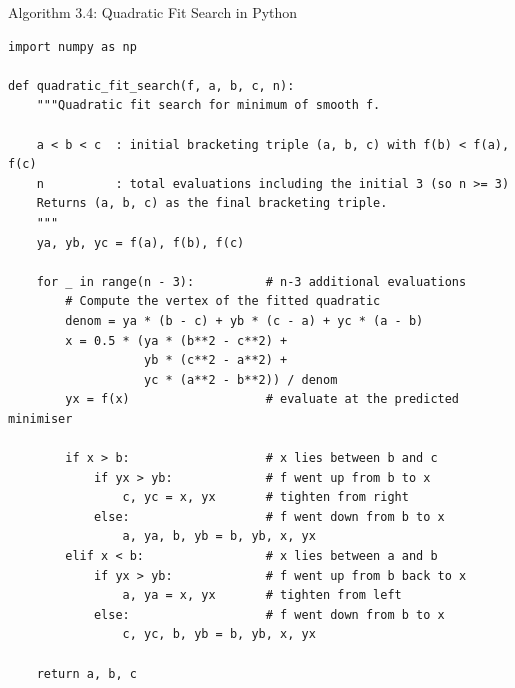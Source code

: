 \documentclass[aspectratio=169,10pt]{beamer}
\begin{document}
\begin{frame}[fragile]{Algorithm 3.4: Quadratic Fit Search in Python}
\begin{lstlisting}[style=pycode, caption={Python: Quadratic fit search with n evaluations starting from triple (a,b,c)}]
import numpy as np

def quadratic_fit_search(f, a, b, c, n):
    """Quadratic fit search for minimum of smooth f.

    a < b < c  : initial bracketing triple (a, b, c) with f(b) < f(a), f(c)
    n          : total evaluations including the initial 3 (so n >= 3)
    Returns (a, b, c) as the final bracketing triple.
    """
    ya, yb, yc = f(a), f(b), f(c)

    for _ in range(n - 3):          # n-3 additional evaluations
        # Compute the vertex of the fitted quadratic
        denom = ya * (b - c) + yb * (c - a) + yc * (a - b)
        x = 0.5 * (ya * (b**2 - c**2) +
                   yb * (c**2 - a**2) +
                   yc * (a**2 - b**2)) / denom
        yx = f(x)                   # evaluate at the predicted minimiser

        if x > b:                   # x lies between b and c
            if yx > yb:             # f went up from b to x
                c, yc = x, yx       # tighten from right
            else:                   # f went down from b to x
                a, ya, b, yb = b, yb, x, yx
        elif x < b:                 # x lies between a and b
            if yx > yb:             # f went up from b back to x
                a, ya = x, yx       # tighten from left
            else:                   # f went down from b to x
                c, yc, b, yb = b, yb, x, yx

    return a, b, c
\end{lstlisting}
\end{frame}
\end{document}
